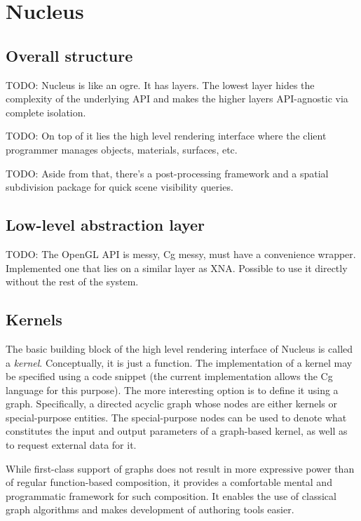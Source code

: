 
\chapter{ Nucleus }
\label{Chapter4}

\section{Overall structure}

TODO: Nucleus is like an ogre. It has layers. The lowest layer hides the complexity of the underlying API and makes the higher layers API-agnostic via complete isolation.

TODO: On top of it lies the high level rendering interface where the client programmer manages objects, materials, surfaces, etc.

TODO: Aside from that, there's a post-processing framework and a spatial subdivision package for quick scene visibility queries.

\section{Low-level abstraction layer}

TODO: The OpenGL API is messy, Cg messy, must have a convenience wrapper. Implemented one that lies on a similar layer as XNA. Possible to use it directly without the rest of the system.

\section{Kernels}

The basic building block of the high level rendering interface of Nucleus is called a \emph{kernel}. Conceptually, it is just a function. The implementation of a kernel may be specified using a code snippet (the current implementation allows the Cg language for this purpose). The more interesting option is to define it using a graph. Specifically, a directed acyclic graph whose nodes are either kernels or special-purpose entities. The special-purpose nodes can be used to denote what constitutes the input and output parameters of a graph-based kernel, as well as to request external data for it.

While first-class support of graphs does not result in more expressive power than of regular function-based composition, it provides a comfortable mental and programmatic framework for such composition. It enables the use of classical graph algorithms and makes development of authoring tools easier.

